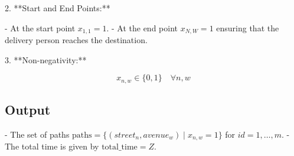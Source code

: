 \documentclass{article}
\begin{document}
2. **Start and End Points:**

   - At the start point \(x_{1,1} = 1\).
   - At the end point \(x_{N,W} = 1\) ensuring that the delivery person reaches the destination.

3. **Non-negativity:**

   \[
   x_{n,w} \in \{0, 1\} \quad \forall n, w
   \]

\subsection*{Output}

- The set of paths \( \text{paths} = \{(street_n, avenue_w) \mid x_{n,w} = 1\} \) for \(id = 1, \ldots, m\).
- The total time is given by \( \text{total_time} = Z \).
\end{document}

